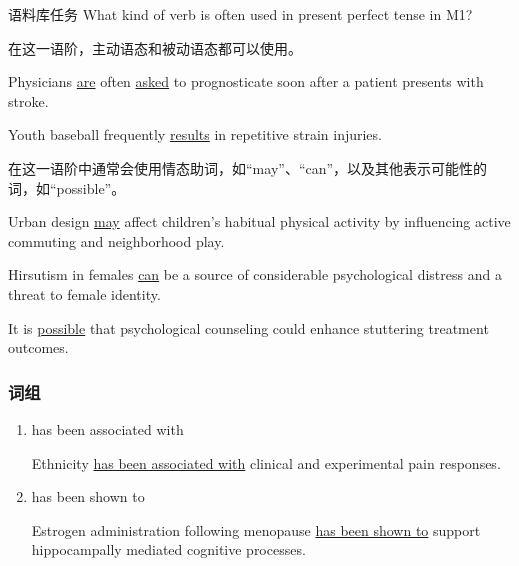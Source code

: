 \documentclass[a4paper]{ctexbook}
\begin{document}
    \begin{task}[label={myautocounter}]{\heiti 语料库任务}
      What kind of verb is often used in present perfect tense in M1?
    \end{task}

    在这一语阶，主动语态和被动语态都可以使用。

    \begin{eg}[label={myautocounter}]{}
      Physicians \uline{are} often \uline{asked} to prognosticate soon after a patient presents with stroke.
    \end{eg}

    \begin{eg}[label={myautocounter}]{}
      Youth baseball frequently \uline{results} in repetitive strain injuries.
    \end{eg}

    在这一语阶中通常会使用情态助词，如“may”、“can”，以及其他表示可能性的词，如“possible”。

    \begin{eg}[label={myautocounter}]{}
      Urban design \uline{may} affect children's habitual physical activity by influencing active commuting and neighborhood play.
    \end{eg}

    \begin{eg}[label={myautocounter}]{}
      Hirsutism in females \uline{can} be a source of considerable psychological distress and a threat to female identity.
    \end{eg}

    \begin{eg}[label={myautocounter}]{}
      It is \uline{possible} that psychological counseling could enhance stuttering treatment outcomes.
    \end{eg}

    \subsubsection{词组}

    \begin{enumerate}
      \item has been associated with
      \begin{eg}[label={myautocounter}]{}
        Ethnicity \uline{has been associated with} clinical and experimental pain responses.
      \end{eg}

      \item has been shown to
      \begin{eg}[label={myautocounter}]{}
        Estrogen administration following menopause \uline{has been shown to} support hippocampally mediated cognitive processes.
      \end{eg}
    \end{enumerate}
  
\end{document}
